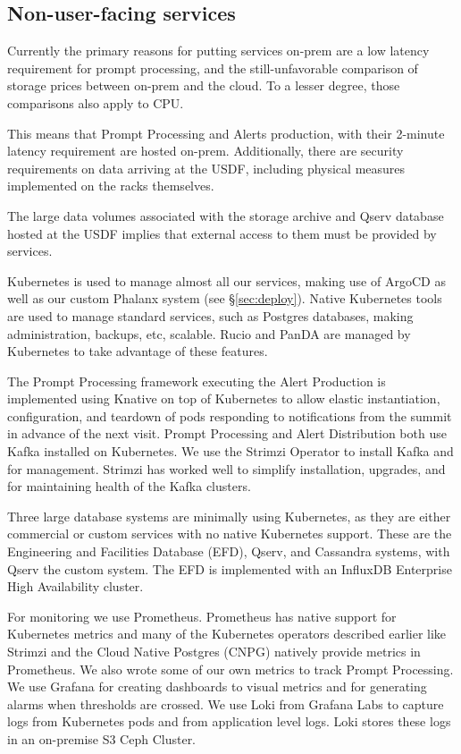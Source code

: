 \subsection{Non-user-facing services}

Currently the primary reasons for putting services on-prem are a low
latency requirement for prompt processing, and the still-unfavorable
comparison of storage prices between on-prem and the cloud. To a lesser
degree, those comparisons also apply to CPU.

This means that Prompt Processing and Alerts production, with their
2-minute latency requirement are hosted on-prem. Additionally, there
are security requirements on data arriving at the USDF, including
physical measures implemented on the racks themselves.\cite{DMTN-199}

The large data volumes associated with the storage archive and Qserv
database hosted at the USDF implies that external access to them must be
provided by services.

Kubernetes is used to manage almost all our services, making use of
ArgoCD as well as our custom Phalanx system (see \S \ref{sec:deploy}).
Native Kubernetes tools
are used to manage standard services, such as Postgres databases,
making administration, backups, etc, scalable. Rucio and PanDA are
managed by Kubernetes to take advantage of these features.

The Prompt Processing framework executing the Alert Production is implemented
using Knative on top of
Kubernetes to allow elastic instantiation, configuration, and teardown of
pods responding to notifications from the summit in advance of the
next visit.
Prompt Processing and Alert Distribution both use Kafka installed on Kubernetes.
We use the Strimzi Operator to install Kafka and for management.  Strimzi
has worked well to simplify installation, upgrades, and for maintaining
health of the Kafka clusters.

Three large database systems are minimally using Kubernetes, as they
are either commercial or custom services with no native Kubernetes
support. These are the Engineering and Facilities Database (EFD),\cite{2024SPIE13101.59Ftmp}
Qserv, and Cassandra systems, with Qserv the custom system.
The EFD is implemented with an InfluxDB Enterprise High Availability cluster.

For monitoring we use Prometheus.  Prometheus has native support for
Kubernetes metrics and many of the Kubernetes operators described earlier
like Strimzi and the Cloud Native Postgres (CNPG) natively provide metrics in Prometheus. We also
wrote some of our own metrics to track Prompt Processing.
We use Grafana for creating dashboards to visual metrics and for generating alarms when thresholds are crossed.
We use Loki from Grafana Labs to capture logs from Kubernetes pods
and from application level logs. Loki stores these logs in an on-premise S3 Ceph Cluster.
